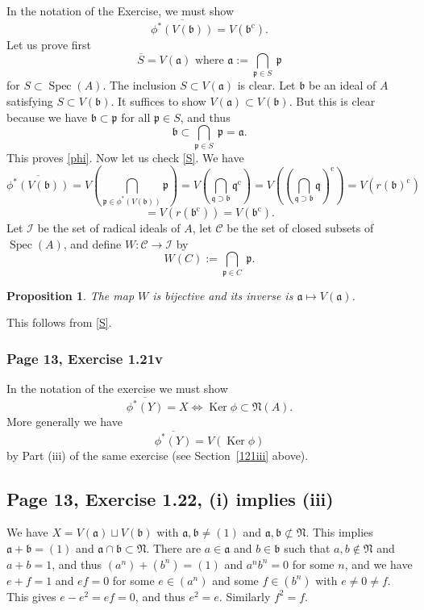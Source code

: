\documentclass[parskip=half,fontsize=12pt]{scrartcl}%
\newcommand{\oo}{\operatorname}\newcommand{\ooo}{\operatorname*}
\newcommand{\mf}{\mathfrak}
\newcommand{\aaa}{\mf a}
\newcommand{\bbb}{\mf b}
\newcommand{\ppp}{\mf p}
\newcommand{\qqq}{\mf q}
\newcommand{\Ker}{\operatorname{Ker}}\newcommand{\Coker}{\operatorname{Coker}}
\newcommand{\Spec}{\operatorname{Spec}}\newcommand{\Sp}{\operatorname{Spec}}
\newtheorem{prop}[thm]{Proposition}
\begin{document}
In the notation of the Exercise, we must show 
\begin{equation}\label{phi}
\overline{\phi^*(V(\bbb))}=V(\bbb^{\oo c}).
\end{equation}
Let us prove first 
\begin{equation}\label{S}
\overline S=V(\aaa)\text{ where }\aaa:=\bigcap_{\ppp\in S}\ \ppp
\end{equation}
for $S\subset\Spec(A)$. The inclusion $S\subset V(\aaa)$ is clear. Let $\bbb$ be an ideal of $A$ satisfying $S\subset V(\bbb)$. It suffices to show $V(\aaa)\subset V(\bbb)$. But this is clear because we have $\bbb\subset\ppp$ for all $\ppp\in S$, and thus 
$$
\bbb\subset\bigcap_{\ppp\in S}\ \ppp=\aaa.
$$ 
This proves \eqref{phi}. Now let us check \eqref{S}. We have 
$$
\overline{\phi^*(V(\bbb))}=V\left(\bigcap_{\ppp\in\phi^*(V(\bbb))}\ppp\right)=V\left(\bigcap_{\qqq\supset\bbb}\qqq^{\oo c}\right)=V\left(\left(\bigcap_{\qqq\supset\bbb}\qqq\right)^{\oo c}\right)=V(r(\bbb)^{\oo c})
$$
$$
=V(r(\bbb^{\oo c}))=V(\bbb^{\oo c}).
$$
Let $\mathcal I$ be the set of radical ideals of $A$, let $\mathcal C$ be the set of closed subsets of $\Spec(A)$, and define $W:\mathcal C\to\mathcal I$ by 
$$
W(C):=\bigcap_{\ppp\in C}\ \ppp.
$$ 
\begin{prop}\label{gal}
The map $W$ is bijective and its inverse is $\aaa\mapsto V(\aaa)$.
\end{prop}
This follows from \eqref{S}.

\subsubsection{Page 13, Exercise 1.21v}\label{121v}%

In the notation of the exercise we must show 
$$
\overline{\phi^*(Y)}=X\iff\Ker\phi\subset\mf N(A).
$$ 
More generally we have 
$$
\overline{\phi^*(Y)}=V(\Ker\phi)
$$ 
by Part (iii) of the same exercise (see Section~\ref{121iii} above).

\subsection{Page 13, Exercise 1.22, (i) implies (iii)}%

We have $X=V(\aaa)\sqcup V(\bbb)$ with $\aaa,\bbb\ne(1)$ and $\aaa,\bbb\not\subset\mf N$. This implies $\aaa+\bbb=(1)$ and $\aaa\cap\bbb\subset\mf N$. There are $a\in\aaa$ and $b\in\bbb$ such that $a,b\notin\mf N$ and $a+b=1$, and thus $(a^n)+(b^n)=(1)$ and $a^nb^n=0$ for some $n$, and we have $e+f=1$ and $ef=0$ for some $e\in(a^n)$ and some $f\in(b^n)$ with $e\ne0\ne f$. This gives $e-e^2=ef=0$, and thus $e^2=e$. Similarly $f^2=f$.
\end{document}
